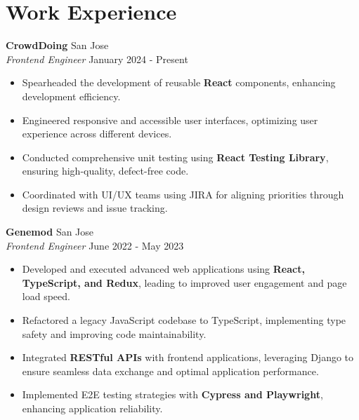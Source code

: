 \documentclass[a4paper,10pt]{article}
\begin{document}
\section*{Work Experience}\vspace{0.5mm}
\noindent \textbf{CrowdDoing} \hfill {San Jose}\\
\vspace{0.5mm}
\textit{Frontend Engineer} \hfill {January 2024 - Present}\vspace{-\baselineskip}
\vspace{2.5mm}
\begin{itemize}
    \item Spearheaded the development of reusable \textbf{React} components, enhancing development efficiency.\vspace{0.3ex}
    \item Engineered responsive and accessible user interfaces, optimizing user experience across different devices.\vspace{0.3ex}
    \item Conducted comprehensive unit testing using \textbf{React Testing Library}, ensuring high-quality, defect-free code.\vspace{0.3ex}
    \item Coordinated with UI/UX teams using JIRA for aligning priorities through design reviews and issue tracking.\vspace{0.3ex}
\end{itemize}

\vspace{3mm}

\noindent \textbf{Genemod} \hfill {San Jose}\\
\textit{Frontend Engineer} \hfill {June 2022 - May 2023}\vspace{-\baselineskip}
\vspace{2.5mm}
\begin{itemize}
    \item Developed and executed advanced web applications using \textbf{React, TypeScript, and Redux}, leading to improved user engagement and page load speed.\vspace{0.3ex}
    \item Refactored a legacy JavaScript codebase to TypeScript, implementing type safety and improving code maintainability.\vspace{0.3ex}
    \item Integrated \textbf{RESTful APIs} with frontend applications, leveraging Django to ensure seamless data exchange and optimal application performance.\vspace{0.3ex}
    \item Implemented E2E testing strategies with \textbf{Cypress and Playwright}, enhancing application reliability.\vspace{0.3ex}
\end{itemize}
\end{document}
